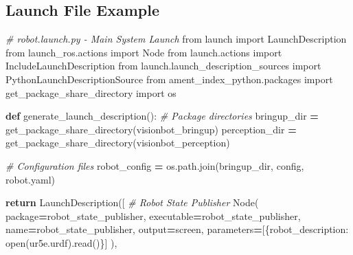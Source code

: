 \documentclass[
]{article}
\newenvironment{Shaded}{\begin{snugshade}}{\end{snugshade}}
\newcommand{\BuiltInTok}[1]{#1}
\newcommand{\CommentTok}[1]{\textcolor[rgb]{0.56,0.35,0.01}{\textit{#1}}}
\newcommand{\ControlFlowTok}[1]{\textcolor[rgb]{0.13,0.29,0.53}{\textbf{#1}}}
\newcommand{\ImportTok}[1]{#1}
\newcommand{\KeywordTok}[1]{\textcolor[rgb]{0.13,0.29,0.53}{\textbf{#1}}}
\newcommand{\NormalTok}[1]{#1}
\newcommand{\OperatorTok}[1]{\textcolor[rgb]{0.81,0.36,0.00}{\textbf{#1}}}
\newcommand{\StringTok}[1]{\textcolor[rgb]{0.31,0.60,0.02}{#1}}
\begin{document}
\hypertarget{launch-file-example}{%
\subsection{Launch File Example}\label{launch-file-example}}

\begin{Shaded}
\begin{Highlighting}[]
\CommentTok{\# robot.launch.py {-} Main System Launch}
\ImportTok{from}\NormalTok{ launch }\ImportTok{import}\NormalTok{ LaunchDescription}
\ImportTok{from}\NormalTok{ launch\_ros.actions }\ImportTok{import}\NormalTok{ Node}
\ImportTok{from}\NormalTok{ launch.actions }\ImportTok{import}\NormalTok{ IncludeLaunchDescription}
\ImportTok{from}\NormalTok{ launch.launch\_description\_sources }\ImportTok{import}\NormalTok{ PythonLaunchDescriptionSource}
\ImportTok{from}\NormalTok{ ament\_index\_python.packages }\ImportTok{import}\NormalTok{ get\_package\_share\_directory}
\ImportTok{import}\NormalTok{ os}

\KeywordTok{def}\NormalTok{ generate\_launch\_description():}
    \CommentTok{\# Package directories}
\NormalTok{    bringup\_dir }\OperatorTok{=}\NormalTok{ get\_package\_share\_directory(}\StringTok{\textquotesingle{}visionbot\_bringup\textquotesingle{}}\NormalTok{)}
\NormalTok{    perception\_dir }\OperatorTok{=}\NormalTok{ get\_package\_share\_directory(}\StringTok{\textquotesingle{}visionbot\_perception\textquotesingle{}}\NormalTok{)}

    \CommentTok{\# Configuration files}
\NormalTok{    robot\_config }\OperatorTok{=}\NormalTok{ os.path.join(bringup\_dir, }\StringTok{\textquotesingle{}config\textquotesingle{}}\NormalTok{, }\StringTok{\textquotesingle{}robot.yaml\textquotesingle{}}\NormalTok{)}

    \ControlFlowTok{return}\NormalTok{ LaunchDescription([}
        \CommentTok{\# Robot State Publisher}
\NormalTok{        Node(}
\NormalTok{            package}\OperatorTok{=}\StringTok{\textquotesingle{}robot\_state\_publisher\textquotesingle{}}\NormalTok{,}
\NormalTok{            executable}\OperatorTok{=}\StringTok{\textquotesingle{}robot\_state\_publisher\textquotesingle{}}\NormalTok{,}
\NormalTok{            name}\OperatorTok{=}\StringTok{\textquotesingle{}robot\_state\_publisher\textquotesingle{}}\NormalTok{,}
\NormalTok{            output}\OperatorTok{=}\StringTok{\textquotesingle{}screen\textquotesingle{}}\NormalTok{,}
\NormalTok{            parameters}\OperatorTok{=}\NormalTok{[\{}\StringTok{\textquotesingle{}robot\_description\textquotesingle{}}\NormalTok{: }\BuiltInTok{open}\NormalTok{(}\StringTok{\textquotesingle{}ur5e.urdf\textquotesingle{}}\NormalTok{).read()\}]}
\NormalTok{        ),}


\end{Highlighting}
\end{Shaded}
\end{document}

